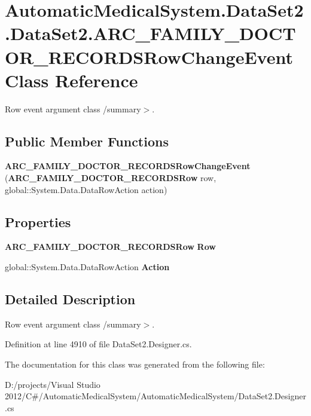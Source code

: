 \section{AutomaticMedicalSystem.DataSet2.DataSet2.ARC\_\-FAMILY\_\-DOCTOR\_\-RECORDSRowChangeEvent Class Reference}
\label{class_automatic_medical_system_1_1_data_set2_1_1_a_r_c___f_a_m_i_l_y___d_o_c_t_o_r___r_e_c_o_r_d_s_row_change_event}
Row event argument class /summary$>$.  


\subsection*{Public Member Functions}
\begin{CompactItemize}
\item 
\textbf{ARC\_\-FAMILY\_\-DOCTOR\_\-RECORDSRowChangeEvent} ({\bf ARC\_\-FAMILY\_\-DOCTOR\_\-RECORDSRow} row, global::System.Data.DataRowAction action)\label{class_automatic_medical_system_1_1_data_set2_1_1_a_r_c___f_a_m_i_l_y___d_o_c_t_o_r___r_e_c_o_r_d_s_row_change_event_dde5bdf6653ba9779d7fdf7545a54a39}

\end{CompactItemize}
\subsection*{Properties}
\begin{CompactItemize}
\item 
{\bf ARC\_\-FAMILY\_\-DOCTOR\_\-RECORDSRow} \textbf{Row}\hspace{0.3cm}{\tt  [get]}\label{class_automatic_medical_system_1_1_data_set2_1_1_a_r_c___f_a_m_i_l_y___d_o_c_t_o_r___r_e_c_o_r_d_s_row_change_event_5e8600f872a8af665909b48841e3a987}

\item 
global::System.Data.DataRowAction \textbf{Action}\hspace{0.3cm}{\tt  [get]}\label{class_automatic_medical_system_1_1_data_set2_1_1_a_r_c___f_a_m_i_l_y___d_o_c_t_o_r___r_e_c_o_r_d_s_row_change_event_c11f55ebb0028c941172fca8051cd948}

\end{CompactItemize}


\subsection{Detailed Description}
Row event argument class /summary$>$. 

Definition at line 4910 of file DataSet2.Designer.cs.

The documentation for this class was generated from the following file:\begin{CompactItemize}
\item 
D:/projects/Visual Studio 2012/C\#/AutomaticMedicalSystem/AutomaticMedicalSystem/DataSet2.Designer.cs\end{CompactItemize}
